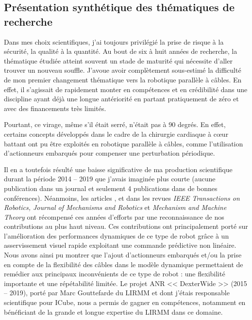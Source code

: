 \documentclass[a4paper,12pt]{article}
\begin{document}
\subsection{Présentation synthétique des thématiques de recherche}


Dans mes choix scientifiques, j’ai toujours privilégié la prise de risque à la sécurité, la qualité à la quantité. Au bout de six à huit années de recherche, la thématique étudiée atteint souvent un stade de maturité qui nécessite d'aller trouver un nouveau souffle. J'avoue avoir complètement sous-estimé la difficulté de mon premier changement thématique vers la robotique parallèle à câbles. En effet, il s’agissait de rapidement monter en compétences et en crédibilité dans une discipline ayant déjà une longue antériorité en partant pratiquement de zéro et avec des financements très limités. 

Pourtant, ce virage, même s’il était serré, n’était pas à 90 degrés. En effet, certains concepts développés dans le cadre de la chirurgie cardiaque à cœur battant ont pu être exploités en robotique parallèle à câbles, comme l’utilisation d’actionneurs embarqués pour compenser une perturbation périodique. 

Il en a toutefois résulté une baisse significative de ma production scientifique durant la période 2014 -- 2019 que j’avais imaginée plus courte (aucune publication dans un journal et seulement 4 publications dans de bonnes conférences). Néanmoins, les articles \cite{2-BCLG19}, \cite{2-CWG20} et \cite{2-CAYD23} dans les revues \textit{IEEE Transactions on Robotics, Journal of Mechanisms and Robotics} et \textit{Mechanism and Machine Theory} ont récompensé ces années d'efforts par une reconnaissance de nos contributions au plus haut niveau. Ces contributions ont principalement porté sur l'amélioration des performances dynamiques de ce type de robot grâce à un asservissement visuel rapide exploitant une commande prédictive non linéaire. Nous avons ainsi pu montrer que l'ajout d'actionneurs embarqués et/ou la prise en compte de la flexibilité des câbles dans le modèle dynamique permettaient de remédier aux principaux inconvénients de ce type de robot : une flexibilité importante et une répétabilité limitée. Le projet ANR << DexterWide >> (2015 -- 2019), porté par Marc Gouttefarde du LIRMM et dont j'étais responsable scientifique pour ICube, nous a permis de gagner en compétences, notamment en bénéficiant de la grande et longue expertise du LIRMM dans ce domaine.
\end{document}

